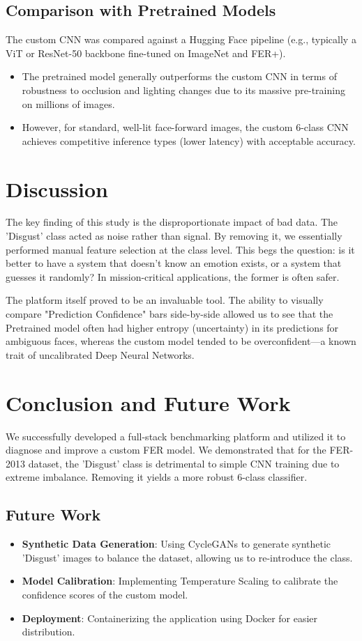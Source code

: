 \documentclass[a4paper,12pt]{article}
\begin{document}
\subsection{Comparison with Pretrained Models}
The custom CNN was compared against a Hugging Face pipeline (e.g., typically a ViT or ResNet-50 backbone fine-tuned on ImageNet and FER+).
\begin{itemize}
    \item The pretrained model generally outperforms the custom CNN in terms of robustness to occlusion and lighting changes due to its massive pre-training on millions of images.
    \item However, for standard, well-lit face-forward images, the custom 6-class CNN achieves competitive inference types (lower latency) with acceptable accuracy.
\end{itemize}

\section{Discussion}
The key finding of this study is the disproportionate impact of bad data. The 'Disgust' class acted as noise rather than signal. By removing it, we essentially performed manual feature selection at the class level. This begs the question: is it better to have a system that doesn't know an emotion exists, or a system that guesses it randomly? In mission-critical applications, the former is often safer.

The platform itself proved to be an invaluable tool. The ability to visually compare "Prediction Confidence" bars side-by-side allowed us to see that the Pretrained model often had higher entropy (uncertainty) in its predictions for ambiguous faces, whereas the custom model tended to be overconfident—a known trait of uncalibrated Deep Neural Networks.

\section{Conclusion and Future Work}
We successfully developed a full-stack benchmarking platform and utilized it to diagnose and improve a custom FER model. We demonstrated that for the FER-2013 dataset, the 'Disgust' class is detrimental to simple CNN training due to extreme imbalance. Removing it yields a more robust 6-class classifier.

\subsection{Future Work}
\begin{itemize}
    \item \textbf{Synthetic Data Generation}: Using CycleGANs to generate synthetic 'Disgust' images to balance the dataset, allowing us to re-introduce the class.
    \item \textbf{Model Calibration}: Implementing Temperature Scaling to calibrate the confidence scores of the custom model.
    \item \textbf{Deployment}: Containerizing the application using Docker for easier distribution.
\end{itemize}
\end{document}
